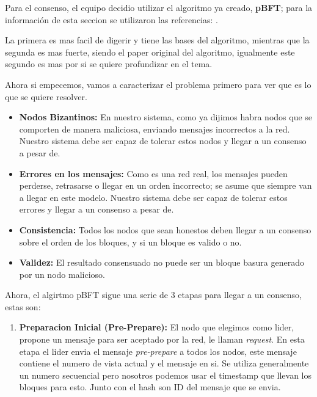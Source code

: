 {\large{
    Para el consenso, el equipo decidio utilizar el algoritmo ya creado, \textbf{pBFT}; para la información de esta seccion se utilizaron las referencias: \cite{geeksforgeeks_pbft} \cite{castro_liskov_1999}. \vspace{0.3cm}

    La primera es mas facil de digerir y tiene las bases del algoritmo, mientras que la segunda es mas fuerte, siendo el paper original del algoritmo, igualmente este segundo es mas por si se quiere profundizar en el tema. \vspace{0.3cm}

    Ahora si empecemos, vamos a caracterizar el problema primero para ver que es lo que se quiere resolver. \vspace{0.3cm}
    \begin{itemize}
        \item \textbf{Nodos Bizantinos:} En nuestro sistema, como ya dijimos habra nodos que se comporten de manera maliciosa, enviando mensajes incorrectos a la red. Nuestro sistema debe ser capaz de tolerar estos nodos y llegar a un consenso a pesar de. 
        \item \textbf{Errores en los mensajes:} Como es una red real, los mensajes pueden perderse, retrasarse o llegar en un orden incorrecto; se asume que siempre van a llegar en este modelo. Nuestro sistema debe ser capaz de tolerar estos errores y llegar a un consenso a pesar de.
        \item \textbf{Consistencia:} Todos los nodos que sean honestos deben llegar a un consenso sobre el orden de los bloques, y si un bloque es valido o no.
        \item \textbf{Validez:} El resultado consensuado no puede ser un bloque basura generado por un nodo malicioso.
    \end{itemize}

    Ahora, el algirtmo pBFT sigue una serie de 3 etapas para llegar a un consenso, estas son:
    \begin{enumerate}
        \item \textbf{Preparacion Inicial (Pre-Prepare):} El nodo que elegimos como lider, propone un mensaje para ser aceptado por la red, le llaman \textit{request}. En esta etapa el lider envia el mensaje \textit{pre-prepare} a todos los nodos, este mensaje contiene el numero de vista actual y el mensaje en si. Se utiliza generalmente un numero secuencial pero nosotros podemos usar el timestamp que llevan los bloques para esto. Junto con el hash son ID del mensaje que se envia.
        

\end{enumerate}}}
